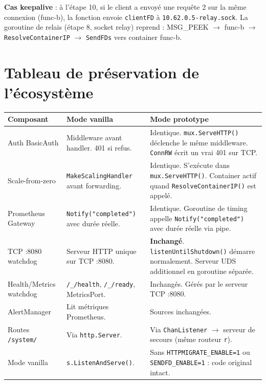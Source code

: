 \documentclass[11pt,a4paper]{article}
\begin{document}
\textbf{Cas keepalive} : à l'étape 10, si le client a envoyé une requête 2 sur la même
connexion (func-b), la fonction envoie \texttt{clientFD} à \texttt{10.62.0.5-relay.sock}.
La goroutine de relais (étape 8, socket relay) reprend : MSG\_PEEK $\to$ func-b $\to$
\texttt{ResolveContainerIP} $\to$ \texttt{SendFDs} vers container func-b.

\section{Tableau de préservation de l'écosystème}

\begin{longtable}{p{} p{} p{}}
\toprule
\textbf{Composant} & \textbf{Mode vanilla} & \textbf{Mode prototype} \\
\midrule
\endhead
Auth BasicAuth &
  Middleware avant handler. 401 si refus. &
  Identique. \texttt{mux.ServeHTTP()} déclenche le même middleware. \texttt{ConnRW}
  écrit un vrai 401 sur TCP. \\
\addlinespace
Scale-from-zero &
  \texttt{MakeScalingHandler} avant forwarding. &
  Identique. S'exécute dans \texttt{mux.ServeHTTP()}. Container actif quand
  \texttt{ResolveContainerIP()} est appelé. \\
\addlinespace
Prometheus Gateway &
  \texttt{Notify("completed")} avec durée réelle. &
  Identique. Goroutine de timing appelle \texttt{Notify("completed")} avec durée
  réelle via pipe. \\
\addlinespace
TCP :8080 watchdog &
  Serveur HTTP unique sur TCP :8080. &
  \textbf{Inchangé}. \texttt{listenUntilShutdown()} démarre normalement.
  Serveur UDS additionnel en goroutine séparée. \\
\addlinespace
Health/Metrics watchdog &
  \texttt{/\_/health}, \texttt{/\_/ready}, MetricsPort. &
  Inchangés. Gérés par le serveur TCP :8080. \\
\addlinespace
AlertManager &
  Lit métriques Prometheus. &
  Sources inchangées. \\
\addlinespace
Routes \texttt{/system/} &
  Via \texttt{http.Server}. &
  Via \texttt{ChanListener} $\to$ serveur de secours (même routeur \texttt{r}). \\
\addlinespace
Mode vanilla &
  \texttt{s.ListenAndServe()}. &
  Sans \texttt{HTTPMIGRATE\_ENABLE=1} ou \texttt{SENDFD\_ENABLE=1} :
  code original intact. \\
\bottomrule
\end{longtable}
\end{document}
